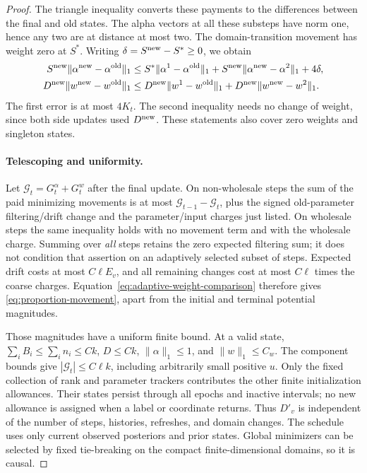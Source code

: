 \begin{proof}
The triangle inequality converts these payments to the differences
between the final and old states.  The alpha vectors at all these
substeps have norm one, hence any two are at distance at most two.
The domain-transition movement has weight zero at $S^*$.
Writing $\delta=S^{\rm new}-S^*\ge0$, we obtain
\begin{equation}\label{eq:adaptive-weight-comparison}
\begin{aligned}
 S^{\rm new}\|\alpha^{\rm new}-\alpha^{\rm old}\|_1
 &\le S^*\|\alpha^1-\alpha^{\rm old}\|_1
      +S^{\rm new}\|\alpha^{\rm new}-\alpha^2\|_1+4\delta,\\
 D^{\rm new}\|w^{\rm new}-w^{\rm old}\|_1
 &\le D^{\rm new}\|w^1-w^{\rm old}\|_1
      +D^{\rm new}\|w^{\rm new}-w^2\|_1.
\end{aligned}
\end{equation}
The first error is at most $4K_t$.  The second inequality needs
no change of weight, since both side updates used $D^{\rm new}$.
These statements also cover zero weights and singleton states.

\paragraph{Telescoping and uniformity.}
Let $\mathcal G_t=G_t^\alpha+G_t^w$ after the final update.
On non-wholesale steps the sum of the paid minimizing movements
is at most $\mathcal G_{t-1}-\mathcal G_t$, plus the signed
old-parameter filtering/drift change and the parameter/input
charges just listed.  On wholesale steps the same inequality
holds with no movement term and with the wholesale charge.
Summing over \emph{all} steps retains the zero expected filtering
sum; it does not condition that assertion on an adaptively
selected subset of steps.  Expected drift costs at most
$C\ell E_v$, and all remaining changes cost at most $C\ell$
times the coarse charges.  Equation~\eqref{eq:adaptive-weight-comparison}
therefore gives \eqref{eq:proportion-movement}, apart from the
initial and terminal potential magnitudes.

Those magnitudes have a uniform finite bound.  At a valid state,
$\sum_iB_i\le\sum_i n_i\le Ck$, $D\le Ck$,
$\|\alpha\|_1\le1$, and $\|w\|_1\le C_w$.
The component bounds give $|\mathcal G_t|\le C\ell k$, including
arbitrarily small positive $u$.  Only the fixed collection of
rank and parameter trackers contributes the other finite
initialization allowances.  Their states persist through all
epochs and inactive intervals; no new allowance is assigned when
a label or coordinate returns.  Thus $D'_v$ is independent of
the number of steps, histories, refreshes, and domain changes.
The schedule uses only current observed posteriors and prior
states.  Global minimizers can be selected by fixed tie-breaking
on the compact finite-dimensional domains, so it is causal.
\end{proof}
